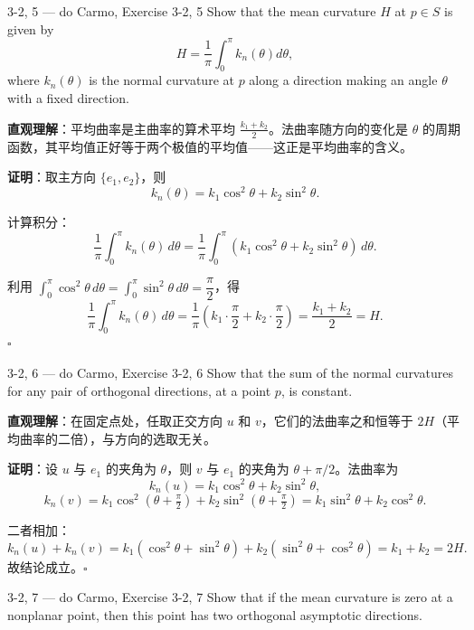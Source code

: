 \begin{exercise}{3-2, 5 — do Carmo, Exercise 3-2, 5}
Show that the mean curvature $H$ at $p \in S$ is given by
\[
H = \frac {1}{\pi} \int_ {0} ^ {\pi} k _ {n} (\theta) d \theta,
\]
where $k_{n}(\theta)$ is the normal curvature at $p$ along a direction making an angle $\theta$ with a fixed direction.
\end{exercise}

\begin{solution}
\textbf{直观理解}：平均曲率是主曲率的算术平均 $\frac{k_1 + k_2}{2}$。法曲率随方向的变化是 $\theta$ 的周期函数，其平均值正好等于两个极值的平均值——这正是平均曲率的含义。

\textbf{证明}：取主方向 $\{e_1, e_2\}$，则
\[
k_n(\theta) = k_1 \cos^2\theta + k_2 \sin^2\theta.
\]

计算积分：
\[
\frac{1}{\pi}\int_0^\pi k_n(\theta)\,d\theta = \frac{1}{\pi}\int_0^\pi (k_1 \cos^2\theta + k_2 \sin^2\theta)\,d\theta.
\]

利用 $\int_0^\pi \cos^2\theta\,d\theta = \int_0^\pi \sin^2\theta\,d\theta = \dfrac{\pi}{2}$，得
\[
\frac{1}{\pi}\int_0^\pi k_n(\theta)\,d\theta = \frac{1}{\pi}\left(k_1 \cdot \frac{\pi}{2} + k_2 \cdot \frac{\pi}{2}\right) = \frac{k_1 + k_2}{2} = H.
\]
$\square$
\end{solution}

\begin{exercise}{3-2, 6 — do Carmo, Exercise 3-2, 6}
Show that the sum of the normal curvatures for any pair of orthogonal directions, at a point $p$, is constant.
\end{exercise}

\begin{solution}
\textbf{直观理解}：在固定点处，任取正交方向 $u$ 和 $v$，它们的法曲率之和恒等于 $2H$（平均曲率的二倍），与方向的选取无关。

\textbf{证明}：设 $u$ 与 $e_1$ 的夹角为 $\theta$，则 $v$ 与 $e_1$ 的夹角为 $\theta + \pi/2$。法曲率为
\[
k_n(u) = k_1 \cos^2\theta + k_2 \sin^2\theta,
\]
\[
k_n(v) = k_1 \cos^2(\theta + \tfrac{\pi}{2}) + k_2 \sin^2(\theta + \tfrac{\pi}{2}) = k_1 \sin^2\theta + k_2 \cos^2\theta.
\]

二者相加：
\[
k_n(u) + k_n(v) = k_1(\cos^2\theta + \sin^2\theta) + k_2(\sin^2\theta + \cos^2\theta) = k_1 + k_2 = 2H.
\]
故结论成立。$\square$
\end{solution}

\begin{exercise}{3-2, 7 — do Carmo, Exercise 3-2, 7}
Show that if the mean curvature is zero at a nonplanar point, then this point has two orthogonal asymptotic directions.
\end{exercise}

